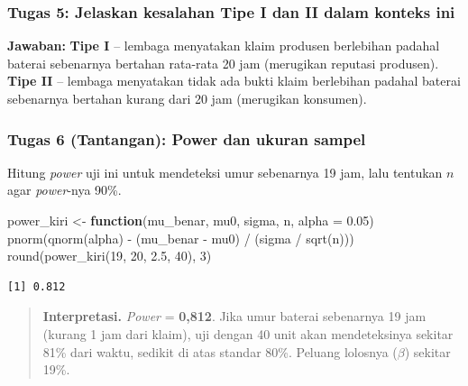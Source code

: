 \documentclass[
  indonesian,
  letterpaper,
]{book}
\newenvironment{Shaded}{\begin{snugshade}}{\end{snugshade}}
\newcommand{\AttributeTok}[1]{\textcolor[rgb]{0.40,0.45,0.13}{#1}}
\newcommand{\ControlFlowTok}[1]{\textcolor[rgb]{0.00,0.23,0.31}{\textbf{#1}}}
\newcommand{\DecValTok}[1]{\textcolor[rgb]{0.68,0.00,0.00}{#1}}
\newcommand{\FloatTok}[1]{\textcolor[rgb]{0.68,0.00,0.00}{#1}}
\newcommand{\FunctionTok}[1]{\textcolor[rgb]{0.28,0.35,0.67}{#1}}
\newcommand{\NormalTok}[1]{\textcolor[rgb]{0.00,0.23,0.31}{#1}}
\newcommand{\OtherTok}[1]{\textcolor[rgb]{0.00,0.23,0.31}{#1}}
\newcommand{\SpecialCharTok}[1]{\textcolor[rgb]{0.37,0.37,0.37}{#1}}
\begin{document}
\subsubsection{Tugas 5: Jelaskan kesalahan Tipe I dan II dalam konteks
ini}\label{tugas-5-jelaskan-kesalahan-tipe-i-dan-ii-dalam-konteks-ini}

\textbf{Jawaban:} \textbf{Tipe I} -- lembaga menyatakan klaim produsen
berlebihan padahal baterai sebenarnya bertahan rata-rata 20 jam
(merugikan reputasi produsen). \textbf{Tipe II} -- lembaga menyatakan
tidak ada bukti klaim berlebihan padahal baterai sebenarnya bertahan
kurang dari 20 jam (merugikan konsumen).

\subsubsection{Tugas 6 (Tantangan): Power dan ukuran
sampel}\label{tugas-6-tantangan-power-dan-ukuran-sampel}

Hitung \emph{power} uji ini untuk mendeteksi umur sebenarnya 19 jam,
lalu tentukan \(n\) agar \emph{power}-nya 90\%.

\begin{Shaded}
\begin{Highlighting}[]
\NormalTok{power\_kiri }\OtherTok{\textless{}{-}} \ControlFlowTok{function}\NormalTok{(mu\_benar, mu0, sigma, n, }\AttributeTok{alpha =} \FloatTok{0.05}\NormalTok{)}
  \FunctionTok{pnorm}\NormalTok{(}\FunctionTok{qnorm}\NormalTok{(alpha) }\SpecialCharTok{{-}}\NormalTok{ (mu\_benar }\SpecialCharTok{{-}}\NormalTok{ mu0) }\SpecialCharTok{/}\NormalTok{ (sigma }\SpecialCharTok{/} \FunctionTok{sqrt}\NormalTok{(n)))}
\FunctionTok{round}\NormalTok{(}\FunctionTok{power\_kiri}\NormalTok{(}\DecValTok{19}\NormalTok{, }\DecValTok{20}\NormalTok{, }\FloatTok{2.5}\NormalTok{, }\DecValTok{40}\NormalTok{), }\DecValTok{3}\NormalTok{)}
\end{Highlighting}
\end{Shaded}

\begin{verbatim}
[1] 0.812
\end{verbatim}

\begin{quote}
\textbf{Interpretasi.} \emph{Power} = \textbf{0,812}. Jika umur baterai
sebenarnya 19 jam (kurang 1 jam dari klaim), uji dengan 40 unit akan
mendeteksinya sekitar 81\% dari waktu, sedikit di atas standar 80\%.
Peluang lolosnya (\(\beta\)) sekitar 19\%.
\end{quote}
\end{document}
